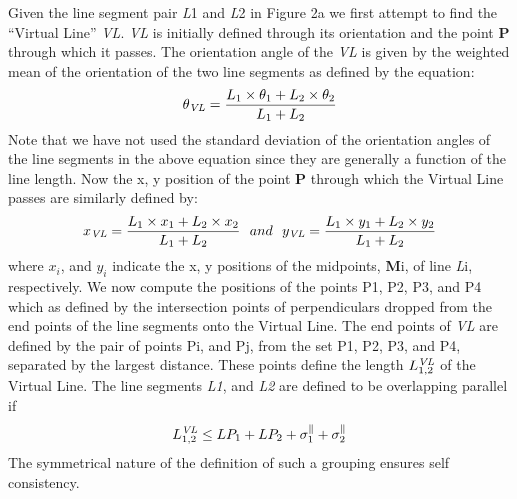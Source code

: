  Given the line segment pair {\it L}1 and {\it L}2 in 
Figure 2a we first attempt to find the ``Virtual Line'' 
{\it VL}. {\it VL} is initially 
defined through its orientation and the point {\bf P} through which it passes. 
The orientation angle of the {\it VL} is given 
by the weighted mean of the orientation of the two line segments as defined by
the equation:
\vspace{-2mm}
\begin{equation}
 \theta_{\it VL} = \frac 
{ L_{1} \times \theta_{1} + L_{2} \times \theta_{2} }
{ L_{1} + L_{2} }
\end{equation}
\vspace{-2mm}
 Note that we have not used the standard deviation of the orientation angles 
of the line segments in the above equation since they are generally a 
function of the line length. Now the x, y position of the point {\bf P} 
through which the Virtual Line passes are similarly defined by:
\vspace{-2mm}
\begin{equation}
 x_{\it VL} = \frac 
{ L_{1} \times x_{1} + L_{2} \times x_{2} }
{ L_{1} + L_{2} }
~~and~~
 y_{\it VL} = \frac 
{ L_{1} \times y_{1} + L_{2} \times y_{2} }
{ L_{1} + L_{2} }
\end{equation}
\vspace{-2mm}
where $x_{i}$, and $y_{i}$ indicate the x, y positions of the midpoints, 
{\bf M}i, of line {\it L}i, respectively. We now compute the positions of the
points P1, P2, P3, and P4 which as defined by the intersection points of
perpendiculars dropped from the end points of the line segments onto the
Virtual Line. The end points of {\it VL} are defined by the pair of
points Pi, and Pj, from the set P1, P2, P3, and P4, separated by the largest 
distance. These points define the length $L^{\it VL}_{1,2}$ of the Virtual 
Line. The line segments {\it L1}, and {\it L2} are defined to be overlapping 
parallel if
\vspace{-2mm}
\begin{equation}
 L^{\it VL}_{1,2} \leq LP_{1} + LP_{2} + 
   \sigma^{\parallel}_{1} + \sigma^{\parallel}_{2}
\end{equation}
\vspace{-2mm}
 The symmetrical nature of the definition of such a grouping ensures self 
consistency. 

